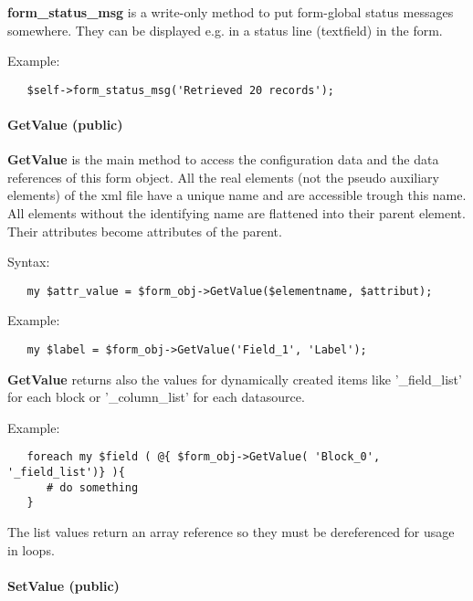 \textbf{form\_status\_msg} is a write-only method to put form-global status messages
somewhere. They can be displayed e.g. in a status line (textfield) in the form.



Example:

\begin{verbatim}
   $self->form_status_msg('Retrieved 20 records');
\end{verbatim}
\paragraph*{GetValue (public)\label{Apiis::Form::Init_--_base_package_for_Form_objects_of_all_types_GetValue_public_}}


\textbf{GetValue} is the main method to access the configuration data and the data
references of this form object. All the real elements (not the pseudo auxiliary
elements) of the xml file have a unique name and are accessible trough this
name. All elements without the identifying name are flattened into their parent
element. Their attributes become attributes of the parent.



Syntax:

\begin{verbatim}
   my $attr_value = $form_obj->GetValue($elementname, $attribut);
\end{verbatim}


Example:

\begin{verbatim}
   my $label = $form_obj->GetValue('Field_1', 'Label');
\end{verbatim}


\textbf{GetValue} returns also the values for dynamically created items like
'\_field\_list' for each block or '\_column\_list' for each datasource.



Example:

\begin{verbatim}
   foreach my $field ( @{ $form_obj->GetValue( 'Block_0', '_field_list')} ){
      # do something
   }
\end{verbatim}


The list values return an array reference so they must be dereferenced for usage
in loops.

\paragraph*{SetValue (public)\label{Apiis::Form::Init_--_base_package_for_Form_objects_of_all_types_SetValue_public_}}


